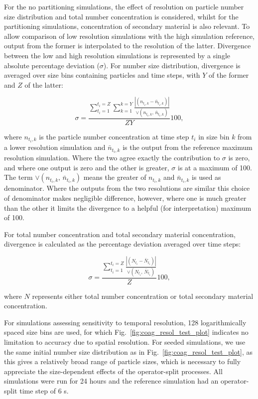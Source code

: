 \documentclass[gmd, manuscript]{copernicus}
\begin{document}
For the no partitioning simulations, the effect of resolution on particle number size distribution and total number concentration is considered, whilst for the partitioning simulations, concentration of secondary material is also relevant.  To allow comparison of low resolution simulations with the high simulation reference, output from the former is interpolated to the resolution of the latter.  Divergence between the low and high resolution simulations is represented by a single absolute percentage deviation ($\sigma$).  For number size distribution, divergence  is averaged over size bins containing particles and time steps, with $Y$ of the former and $Z$ of the latter:

\begin{equation} \label{eq:tr_diverg_nsd}
\sigma = \frac{\sum_{t_i=1}^{t_i=Z} \sum_{k=1}^{k=Y}\frac{|(n_{t_i,k}-\bar{n}_{t_i,k})|}{\lor(n_{t_i,k},\, \bar{n}_{t_i,k})}}{ZY}100,
\end{equation}

where $n_{t_i,k}$ is the particle number concentration at time step $t_i$ in size bin $k$ from a lower resolution simulation and $\bar{n}_{t_i,k}$ is the output from the reference maximum resolution simulation.  Where the two agree exactly the contribution to $\sigma$ is zero, and where one output is zero and the other is greater, $\sigma$ is at a maximum of 100.  The term $\lor(n_{t_i,k},\, \bar{n}_{t_i,k})$ means the greater of $n_{t_i,k}$ and $\bar{n}_{t_i,k}$ is used as denominator.  Where the outputs from the two resolutions are similar this choice of denominator makes negligible difference, however, where one is much greater than the other it limits the divergence to a helpful (for interpretation) maximum of 100.  

For total number concentration and total secondary material concentration, divergence is calculated as the percentage deviation averaged over time steps:

\begin{equation} \label{eq:tr_diverg}
\sigma = \frac{\sum_{t_i=1}^{t_i=Z} \frac{|(N_{t_i}-\bar{N}_{t_i})|}{\lor(N_{t_i},\, \bar{N}_{t_i})}}{Z}100,
\end{equation}

where $N$ represents either total number concentration or total secondary material concentration.

For simulations assessing sensitivity to temporal resolution, 128 logarithmically spaced size bins are used, for which Fig.~\ref{fig:coag_resol_test_plot} indicates no limitation to accuracy due to spatial resolution.  For seeded simulations, we use the same initial number size distribution as in Fig.~\ref{fig:coag_resol_test_plot}, as this gives a relatively broad range of particle sizes, which is necessary to fully appreciate the size-dependent effects of the operator-split processes.  All simulations were run for 24 hours and the reference simulation had an operator-split time step of 6 s.
\end{document}
